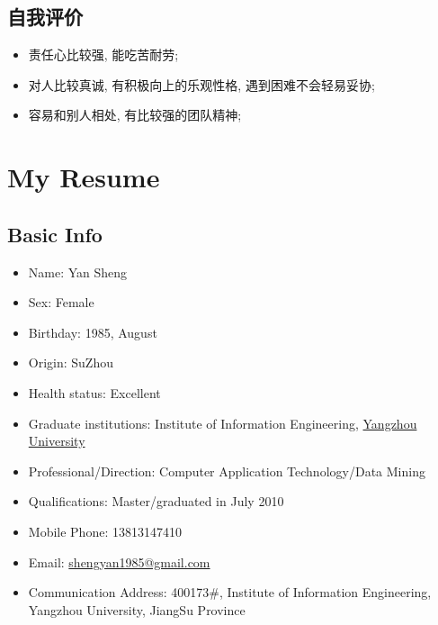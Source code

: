 \documentclass[a4paper,10pt,english]{manual}
\begin{document}
\section{自我评价}
\begin{itemize}
\item {} 
责任心比较强, 能吃苦耐劳;

\item {} 
对人比较真诚, 有积极向上的乐观性格, 遇到困难不会轻易妥协;

\item {} 
容易和别人相处, 有比较强的团队精神;

\end{itemize}

\resetcurrentobjects

\chapter{My Resume}
\section{Basic Info}
\begin{itemize}
\item {} 
Name: Yan Sheng

\item {} 
Sex: Female

\item {} 
Birthday: 1985, August

\item {} 
Origin: SuZhou

\item {} 
Health status: Excellent

\item {} 
Graduate institutions: Institute of Information Engineering, \href{http://www.yzu.edu.cn}{Yangzhou University}

\item {} 
Professional/Direction: Computer Application Technology/Data Mining

\item {} 
Qualifications: Master/graduated in July 2010

\item {} 
Mobile Phone: 13813147410

\item {} 
Email: \href{mailto:shengyan1985@gmail.com}{shengyan1985@gmail.com}

\item {} 
Communication Address: 400173\#, Institute of Information Engineering, Yangzhou University, JiangSu Province

\end{itemize}
\end{document}

